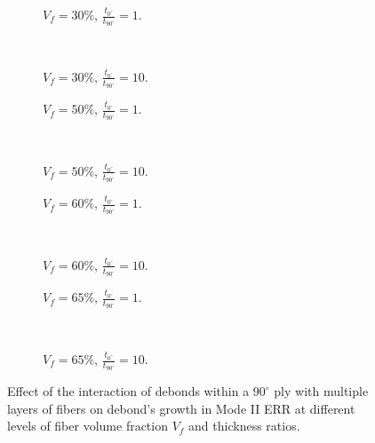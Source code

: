 \documentclass[review]{elsarticle}
\begin{document}
\begin{figure}[!h]
\centering
   \begin{subfigure}[b]{0.45\textwidth}
        \caption{$V_{f}=30\%$, $\frac{t_{0^{\circ}}}{t_{90^{\circ}}}=1$.}\label{subfig:sideabovefiber30MIIthick1}
    \end{subfigure} ~
    \begin{subfigure}[b]{0.45\textwidth}
         \caption{$V_{f}=30\%$, $\frac{t_{0^{\circ}}}{t_{90^{\circ}}}=10$.}\label{subfig:sideabovefiber30MIIthick10}
    \end{subfigure}

   \begin{subfigure}[b]{0.45\textwidth}
        \caption{$V_{f}=50\%$, $\frac{t_{0^{\circ}}}{t_{90^{\circ}}}=1$.}\label{subfig:sideabovefiber50MIIthick1}
    \end{subfigure} ~
    \begin{subfigure}[b]{0.45\textwidth}
         \caption{$V_{f}=50\%$, $\frac{t_{0^{\circ}}}{t_{90^{\circ}}}=10$.}\label{subfig:sideabovefiber50MIIthick10}
    \end{subfigure}

    \begin{subfigure}[b]{0.45\textwidth}
        \caption{$V_{f}=60\%$, $\frac{t_{0^{\circ}}}{t_{90^{\circ}}}=1$.}\label{subfig:sideabovefiber60MIIthick1}
    \end{subfigure} ~
    \begin{subfigure}[b]{0.45\textwidth}
        \caption{$V_{f}=60\%$, $\frac{t_{0^{\circ}}}{t_{90^{\circ}}}=10$.}\label{subfig:sideabovefiber60MIIthick10}
    \end{subfigure}

    \begin{subfigure}[b]{0.45\textwidth}
        \caption{$V_{f}=65\%$, $\frac{t_{0^{\circ}}}{t_{90^{\circ}}}=1$.}\label{subfig:sideabovefiber65MIIthick1}
    \end{subfigure} ~
    \begin{subfigure}[b]{0.45\textwidth}
        \caption{$V_{f}=65\%$, $\frac{t_{0^{\circ}}}{t_{90^{\circ}}}=10$.}\label{subfig:sideabovefiber65MIIthick10}
    \end{subfigure}

\caption{Effect of the interaction of debonds within a $90^{\circ}$ ply with multiple layers of fibers on debond's growth in Mode II ERR at different levels of fiber volume fraction $V_{f}$ and thickness ratios.}\label{fig:sideabovefibersMII}
\end{figure}
\end{document}
